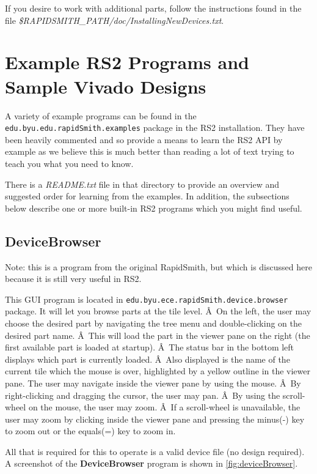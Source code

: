 \documentclass[12pt]{article}
\newcommand{\fil}[1]{{\em #1}}
\newcommand{\pkg}[1]{{\texttt{#1}}}
\newcommand{\pgm}[1]{{\textbf{#1}}}
\begin{document}
If you desire to work with additional parts, follow the instructions found in the
file \fil{\$RAPIDSMITH\_PATH/doc/InstallingNewDevices.txt}.

\section{Example RS2 Programs and Sample Vivado Designs}

A variety of example programs can be found in the
\pkg{edu.byu.edu.rapidSmith.examples} package in the RS2 installation.
They have been heavily commented and so provide a means to learn the RS2 API by
example as we believe this is much better than reading a lot of text trying to
teach you what you need to know.

There is a \fil{README.txt} file in that directory to provide an overview and
suggested order for learning from the examples.
In addition, the subsections below describe one or more built-in RS2 programs
which you might find useful.

\subsection{\pgm{DeviceBrowser}}
Note: this is a program from the original RapidSmith, but which is discussed
here because it is still very useful in RS2. 

This GUI program is located in \pkg{edu.byu.ece.rapidSmith.device.browser}
package.  It will let you browse parts at the tile level. Â On the left, the user
may choose the desired part by navigating the tree menu and double-clicking on
the desired part name. Â This will load the part in the viewer pane on the right
(the first available part is loaded at startup). Â The status bar in the bottom
left displays which part is currently loaded. Â Also displayed is the name of the
current tile which the mouse is over, highlighted by a yellow outline in the
viewer pane. The user may navigate inside the viewer pane by using the mouse.
Â By right-clicking and dragging the cursor, the user may pan. Â By using the
scroll-wheel on the mouse, the user may zoom. Â If a scroll-wheel is unavailable,
the user may zoom by clicking inside the viewer pane and pressing the minus(-)
key to zoom out or the equals(=) key to zoom in.

All that is required for this to operate is a valid device file (no design
required). A screenshot of the \pgm{DeviceBrowser} program is shown in
\autoref{fig:deviceBrowser}.
\end{document}
